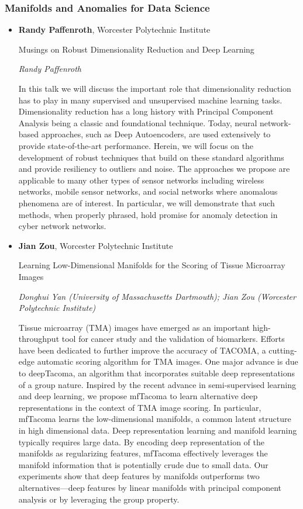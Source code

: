 \subsubsection*{Manifolds and Anomalies for Data Science}

\begin{itemize}
\item \textbf{Randy Paffenroth}, Worcester Polytechnic Institute

Musings on Robust Dimensionality Reduction and Deep Learning

\emph{\footnotesize Randy Paffenroth}

In this talk we will discuss the important role that dimensionality reduction has to play in many supervised and unsupervised machine learning tasks.  Dimensionality reduction has a long history with Principal Component Analysis being a classic and foundational technique.   Today, neural network-based approaches, such as Deep Autoencoders, are used extensively to provide state-of-the-art performance.   Herein, we will focus on the development of robust techniques that build on these standard algorithms and provide resiliency to outliers and noise.  The approaches we propose are applicable to many other types of sensor networks including wireless networks, mobile sensor networks, and social networks where anomalous phenomena are of interest.  In particular, we will demonstrate that such methods, when properly phrased, hold promise for anomaly detection in cyber network networks.

\item \textbf{Jian Zou}, Worcester Polytechnic Institute

Learning Low-Dimensional Manifolds for the Scoring of Tissue Microarray Images

\emph{\footnotesize Donghui Yan (University of Massachusetts Dartmouth); Jian Zou (Worcester Polytechnic Institute)}

Tissue microarray (TMA) images have emerged as an important high-throughput tool for cancer study and the validation of biomarkers. Efforts have been dedicated to further improve the accuracy of TACOMA, a cutting-edge automatic scoring algorithm for TMA images. One major advance is due to deepTacoma, an algorithm that incorporates suitable deep representations of a group nature. Inspired by the recent advance in semi-supervised learning and deep learning, we propose mfTacoma to learn alternative deep representations in the context of TMA image scoring. In particular, mfTacoma learns the low-dimensional manifolds, a common latent structure in high dimensional data. Deep representation learning and manifold learning typically requires large data. By encoding deep representation of the manifolds as regularizing features, mfTacoma effectively leverages the manifold information that is potentially crude due to small data. Our experiments show that deep features by manifolds outperforms two alternatives---deep features by linear manifolds with principal component analysis or by leveraging the group property.


\end{itemize}
